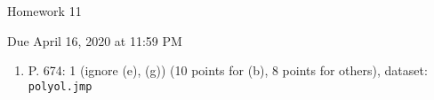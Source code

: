 \documentclass{article}
\begin{document}
\begin{center} \LARGE
Homework 11
\end{center}
\begin{center} \Large
Due April 16, 2020 at 11:59 PM 
\end{center}



\begin{enumerate}
	\item P. 674: 1 (ignore (e), (g)) (10 points for (b), 8 points for others), dataset: {\tt polyol.jmp} 
	
\end{enumerate}
% 
%
\end{document}
